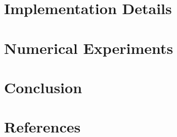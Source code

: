 \documentclass[3p, 11pt]{elsarticle}
\begin{document}
%

\section{Implementation Details}\label{section:implementation}


\section{Numerical Experiments}\label{section:numerical}


\section{Conclusion}\label{section:conclusion}


\clearpage
\section*{References}
	
	
	
\end{document}

